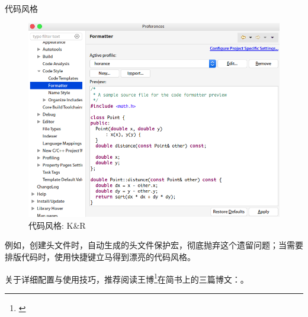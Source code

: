 \begin{content}
\begin{episode}{代码风格}
\begin{content}
\begin{figure}[H]
\centering
\includegraphics[width=1.0\textwidth]{figures/xunit/eclipse-formatter.png}
\caption{代码风格: K\&R}
 \label{fig:eclipse-formatter}
\end{figure}

例如，创建头文件时，自动生成的头文件保护宏，彻底抛弃这个遗留问题；当需要排版代码时，使用快捷键立马得到漂亮的代码风格。

关于详细配置与使用技巧，推荐阅读王博\footnote{\href{https://www.jianshu.com/u/92b7d9879f20}{}}在简书上的三篇博文：\href{https://www.jianshu.com/p/dafcdce1f9cb}{}。

\end{content}
\end{episode}

\end{content}
